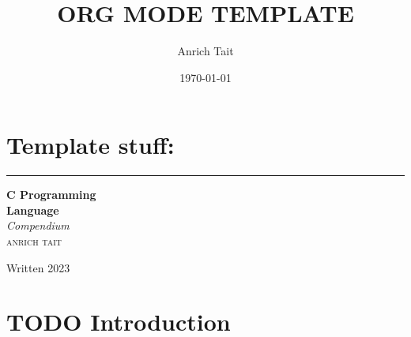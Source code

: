 \documentclass[a4paper]{article}
\author{Anrich Tait}
\date{\today}
\title{ORG MODE TEMPLATE}
\begin{document}
\section{Template stuff:}
\label{sec:org82ddd03}

\newcommand*{\plogo}{\fbox{$\mathcal{PL}$}} %





\begin{titlepage} %
	
	\raggedleft %
	
	\rule{1pt}{\textheight} %
	\hspace{0.05\textwidth} %
	\parbox[b]{0.75\textwidth}{ %
		
		{\Huge\bfseries C Programming \\[0.5\baselineskip] Language}\\[2\baselineskip] %
		{\large\textit{Compendium }}\\[4\baselineskip] %
		{\Large\textsc{anrich tait}} %
		
		\vspace{0.5\textheight} %
		
		{\noindent Written 2023}\\[\baselineskip] %
	}


\end{titlepage}

\tableofcontents
\newpage

\section{{\bfseries\sffamily TODO} Introduction}
\label{sec:orga103549}
\end{document}
